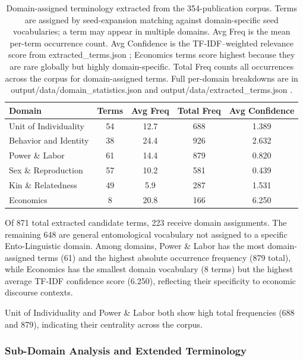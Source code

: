 \documentclass[
]{article}
\numberwithin{equation}{section}
\renewcommand{\texttt}[1]{%
    \colorbox{codebg}{\color{codefg}\ttfamily #1}%
}
\begin{document}
\begin{table}[h]
\centering
\begin{tabular}{|l|c|c|c|c|}
\hline
\textbf{Domain} & \textbf{Terms} & \textbf{Avg Freq} & \textbf{Total Freq} & \textbf{Avg Confidence} \\
\hline
Unit of Individuality & 54 & 12.7 & 688 & 1.389 \\
Behavior and Identity & 38 & 24.4 & 926 & 2.632 \\
Power \& Labor & 61 & 14.4 & 879 & 0.820 \\
Sex \& Reproduction & 57 & 10.2 & 581 & 0.439 \\
Kin \& Relatedness & 49 & 5.9 & 287 & 1.531 \\
Economics & 8 & 20.8 & 166 & 6.250 \\
\hline
\end{tabular}
\caption{Domain-assigned terminology extracted from the 354-publication corpus. Terms are assigned by seed-expansion matching against domain-specific seed vocabularies; a term may appear in multiple domains. Avg Freq is the mean per-term occurrence count. Avg Confidence is the TF-IDF–weighted relevance score from \texttt{extracted\_terms.json}; Economics terms score highest because they are rare globally but highly domain-specific. Total Freq counts all occurrences across the corpus for domain-assigned terms. Full per-domain breakdowns are in \texttt{output/data/domain\_statistics.json} and \texttt{output/data/extracted\_terms.json}.}
\label{tab:terminology_extraction}
\end{table}

Of 871 total extracted candidate terms, 223 receive domain assignments.
The remaining 648 are general entomological vocabulary not assigned to a
specific Ento-Linguistic domain. Among domains, Power \& Labor has the
most domain-assigned terms (61) and the highest absolute occurrence
frequency (879 total), while Economics has the smallest domain
vocabulary (8 terms) but the highest average TF-IDF confidence score
(6.250), reflecting their specificity to economic discourse contexts.

Unit of Individuality and Power \& Labor both show high total
frequencies (688 and 879), indicating their centrality across the
corpus.

\subsubsection{Sub-Domain Analysis and Extended
Terminology}\label{sub-domain-analysis-and-extended-terminology}
\end{document}
